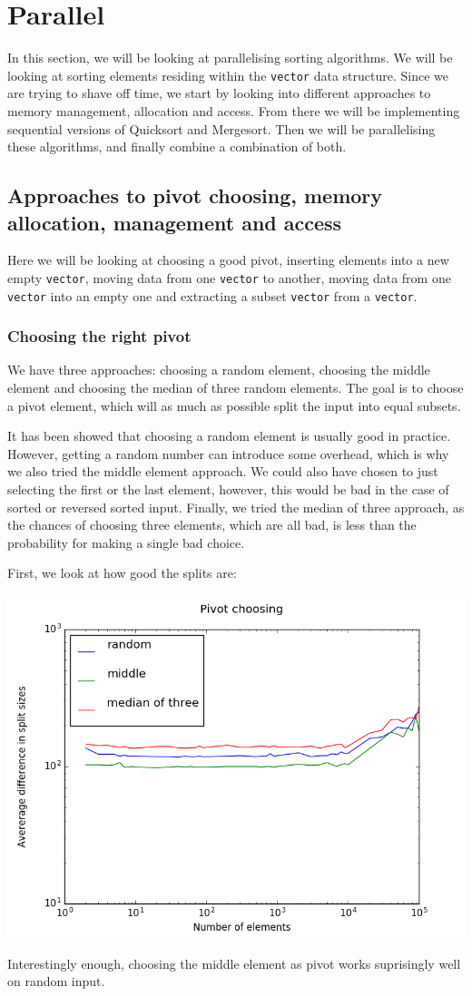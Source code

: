 \section{Parallel}
In this section, we will be looking at parallelising sorting algorithms. We
will be looking at sorting elements residing within the \texttt{vector} data
structure. Since we are trying to shave off time, we start by looking into
different approaches to memory management, allocation and access. From there we
will be implementing sequential versions of Quicksort and Mergesort. Then we
will be parallelising these algorithms, and finally combine a combination of
both.

\subsection{Approaches to pivot choosing, memory allocation, management and
access}
Here we will be looking at choosing a good pivot, inserting elements into a new
empty \texttt{vector}, moving data from one \texttt{vector} to another, moving
data from one \texttt{vector} into an empty one and extracting a subset
\texttt{vector} from a \texttt{vector}.

\subsubsection{Choosing the right pivot}
We have three approaches: choosing a random element, choosing the middle
element and choosing the median of three random elements. The goal is to choose
a pivot element, which will as much as possible split the input into equal
subsets.

It has been showed that choosing a random element is usually good in practice.
However, getting a random number can introduce some overhead, which is why we
also tried the middle element approach. We could also have chosen to just
selecting the first or the last element, however, this would be bad in the case
of sorted or reversed sorted input. Finally, we tried the median of three
approach, as the chances of choosing three elements, which are all bad, is less
than the probability for making a single bad choice.

First, we look at how good the splits are:
\begin{center}
\includegraphics[width=.5\linewidth]{graphs/pivot_split}
\end{center}
Interestingly enough, choosing the middle element as pivot works suprisingly
well on random input.

